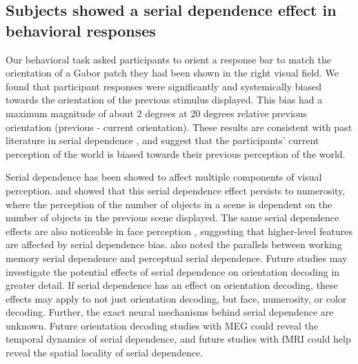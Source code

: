 \documentclass[../main.tex]{subfiles}
\begin{document}
\subsection*{Subjects showed a serial dependence effect in behavioral responses}
Our behavioral task asked participants to orient a response bar to match the orientation of a Gabor patch they had been shown in the right visual field. We found that participant responses were significantly and systemically biased towards the orientation of the previous stimulus displayed. This bias had a maximum magnitude of about 2 degrees at 20 degrees relative previous orientation (previous - current orientation). These results are consistent with past literature in serial dependence \citep{fischer_whitney_2014, Cicchini7867, liberman_2014, Manassi, KIYONAGA2017493}, and suggest that the participants' current perception of the world is biased towards their previous perception of the world.

Serial dependence has been showed to affect multiple components of visual perception. \cite{corbett} and \cite{Cicchini7867} showed that this serial dependence effect persists to numerosity, where the perception of the number of objects in a scene is dependent on the number of objects in the previous scene displayed. The same serial dependence effects are also noticeable in face perception \citep{liberman_2014}, suggesting that higher-level features are affected by serial dependence bias. \cite{KIYONAGA2017493} also noted the parallels between working memory serial dependence and perceptual serial dependence. Future studies may investigate the potential effects of serial dependence on orientation decoding in greater detail. If serial dependence has an effect on orientation decoding, these effects may apply to not just orientation decoding, but face, numerosity, or color decoding. Further, the exact neural mechanisms behind serial dependence are unknown. Future orientation decoding studies with MEG could reveal the temporal dynamics of serial dependence, and future studies with fMRI could help reveal the spatial locality of serial dependence.
\end{document}
